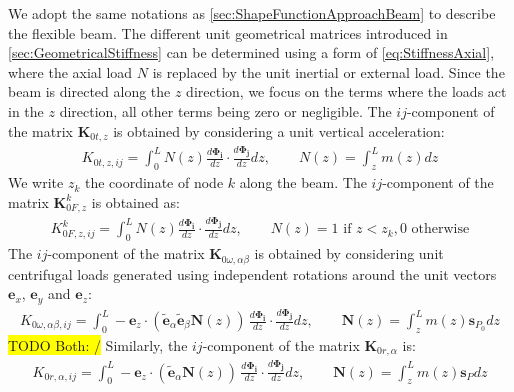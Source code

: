 \documentclass[wes, manuscript]{copernicus}
\renewcommand{\v}[1]{\boldsymbol{#1}}
\newcommand{\m}[1]{\boldsymbol{#1}}
\newcommand{\todoBoth}    [1]{{\colorbox{yellow}{TODO Both:    }}{\color{red}{#1}}\colorbox{yellow}{/}}
\begin{document}
We adopt the same notations as \autoref{sec:ShapeFunctionApproachBeam} to describe the flexible beam.
The different unit geometrical matrices introduced in \autoref{sec:GeometricalStiffness} can be determined using a form of \autoref{eq:StiffnessAxial}, where the axial load $N$ is replaced by the unit inertial or external load. Since the beam is directed along the $z$ direction, we focus on the terms where the loads act in the $z$ direction, all other terms being zero or negligible.
The $ij$-component of the matrix $\m{K}_{0t,z}$ is obtained by considering a unit vertical acceleration:
\begin{align}
   K_{0t,z,ij} = \int_0^L N(z) \frac{d\v{\Phi_i}}{dz}\cdot\frac{d\v{\Phi_j}}{dz} dz, 
   \qquad
   N(z) = \int_z^L m(z) dz
\end{align}
% 
We write $z_k$ the coordinate of node $k$ along the beam. The $ij$-component of the matrix $\m{K}_{0F,z}^k$ is obtained as:
\begin{align}
   K_{0F,z,ij}^k = \int_0^L N(z) \frac{d\v{\Phi_i}}{dz}\cdot\frac{d\v{\Phi_j}}{dz} dz, 
   \qquad
   N(z) = 1 \text{ if $z<z_k$}, 0 \text{ otherwise} 
\end{align}
The $ij$-component of the matrix $\m{K}_{0\omega,\alpha\beta}$ is obtained by considering unit centrifugal loads generated using independent rotations around the unit vectors $\v{e}_x$, $\v{e}_y$ and $\v{e}_z$:
\begin{align}
   K_{0\omega,\alpha\beta,ij} = \int_0^L -\v{e}_z\cdot\left(\tilde{\v{e}}_\alpha\tilde{\v{e}}_\beta \v{N}(z) \right)
   \, \frac{d\v{\Phi_i}}{dz}\cdot\frac{d\v{\Phi_j}}{dz} dz, 
   \qquad
   \v{N}(z) =  \int_z^L m(z) \v{s}_{P_0} dz
\end{align}
\todoBoth{Changed $\v{s}_{P}$ to $\v{s}_{P_0}$}
Similarly, the $ij$-component of the matrix $\m{K}_{0r,\alpha}$ is:
\begin{align}
   K_{0r,\alpha,ij} = \int_0^L -\v{e}_z\cdot\left(\tilde{\v{e}}_\alpha \v{N}(z) \right)
   \, \frac{d\v{\Phi_i}}{dz}\cdot\frac{d\v{\Phi_j}}{dz} dz, 
   \qquad
   \v{N}(z) =  \int_z^L m(z) \v{s}_{P} dz
\end{align}

\end{document}
